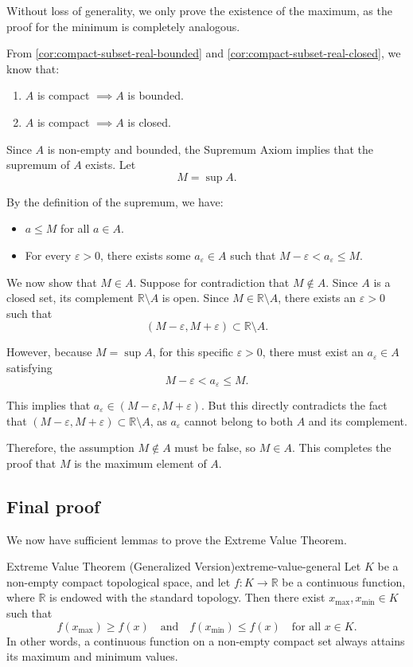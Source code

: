 \documentclass[UTF8,12pt,a4paper]{ctexart}
\makeatletter
\numberwithin{equation}{section}
\newcommand{\currentProofColor}{black}
\renewenvironment{proof}[1][Proof]{%
  \par
  \begingroup
  \edef\proofQEDColor{\currentProofColor}%
  \renewcommand{\qedsymbol}{\textcolor{\proofQEDColor}{$\blacksquare$}}%
  \pushQED{\qed}%
  \normalfont
  \topsep6\p@\@plus6\p@\relax
  \trivlist
  \item[\hskip\labelsep\bfseries\itshape #1\@addpunct{.}]\ignorespaces
}{%
  \popQED
  \endtrivlist
  \@endpefalse
  \endgroup
}
\makeatother
\begin{document}
\begin{proof}
Without loss of generality, we only prove the existence of the maximum, as the proof for the minimum is completely analogous.

From \ref{cor:compact-subset-real-bounded} and \ref{cor:compact-subset-real-closed}, we know that:
\begin{enumerate}
    \item $A$ is compact $\implies A$ is bounded.
    \item $A$ is compact $\implies A$ is closed.
\end{enumerate}

Since $A$ is non-empty and bounded, the Supremum Axiom implies that the supremum of $A$ exists. Let
$$
M = \sup A.
$$

By the definition of the supremum, we have:
\begin{itemize}
    \item $a \le M$ for all $a \in A$.
    \item For every $\varepsilon > 0$, there exists some $a_\varepsilon \in A$ such that $M - \varepsilon < a_\varepsilon \le M$.
\end{itemize}

We now show that $M \in A$. Suppose for contradiction that $M \notin A$. Since $A$ is a closed set, its complement $\mathbb{R} \setminus A$ is open. Since $M \in \mathbb{R} \setminus A$, there exists an $\varepsilon > 0$ such that 
$$
(M - \varepsilon, M + \varepsilon) \subset \mathbb{R} \setminus A.
$$

However, because $M = \sup A$, for this specific $\varepsilon > 0$, there must exist an $a_\varepsilon \in A$ satisfying
$$
M - \varepsilon < a_\varepsilon \le M.
$$

This implies that $a_\varepsilon \in (M - \varepsilon, M + \varepsilon)$. But this directly contradicts the fact that $(M - \varepsilon, M + \varepsilon) \subset \mathbb{R} \setminus A$, as $a_\varepsilon$ cannot belong to both $A$ and its complement.

Therefore, the assumption $M \notin A$ must be false, so $M \in A$. This completes the proof that $M$ is the maximum element of $A$.
\end{proof}
\subsection{Final proof}
We now have sufficient lemmas to prove the Extreme Value Theorem.
\begin{thm}{Extreme Value Theorem (Generalized Version)}{extreme-value-general}
Let $K$ be a non-empty compact topological space, and let $f: K \to \mathbb{R}$ be a continuous function, where $\mathbb{R}$ is endowed with the standard topology. Then there exist $x_{\max}, x_{\min} \in K$ such that
$$
f(x_{\max}) \ge f(x) \quad \text{and} \quad f(x_{\min}) \le f(x) \quad \text{for all } x \in K.$$
In other words, a continuous function on a non-empty compact set always attains its maximum and minimum values.
\end{thm}
\end{document}
